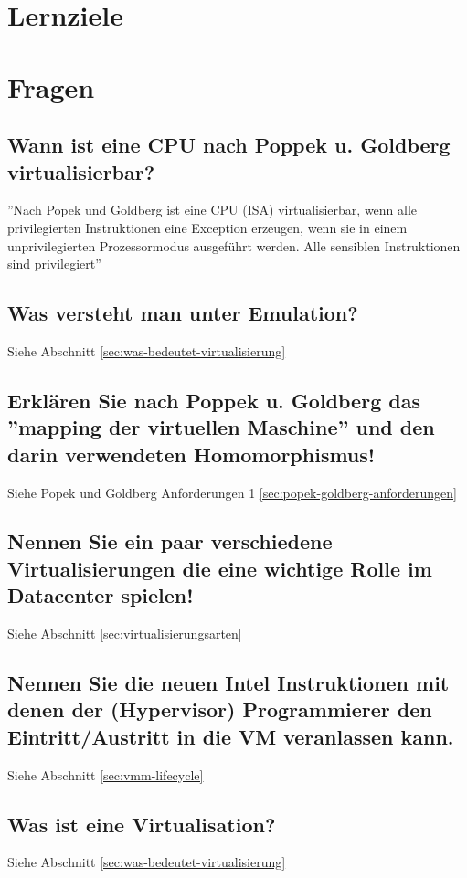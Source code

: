 \section{Lernziele}

\section{Fragen}
\subsection{Wann ist eine CPU nach Poppek u. Goldberg virtualisierbar?}
''Nach Popek und Goldberg ist eine CPU (ISA) virtualisierbar, wenn
alle privilegierten Instruktionen eine Exception erzeugen, wenn sie
in einem unprivilegierten Prozessormodus ausgeführt werden.
Alle sensiblen Instruktionen sind privilegiert''

\subsection{Was versteht man unter Emulation?}
Siehe Abschnitt \ref{sec:was-bedeutet-virtualisierung}

\subsection{Erklären Sie nach Poppek u. Goldberg das ''mapping der virtuellen Maschine'' und den darin verwendeten Homomorphismus!}
Siehe Popek und Goldberg Anforderungen 1 \ref{sec:popek-goldberg-anforderungen}

\subsection{Nennen Sie ein paar verschiedene Virtualisierungen die eine wichtige Rolle im Datacenter spielen!}
Siehe Abschnitt \ref{sec:virtualisierungsarten}

\subsection{Nennen Sie die neuen Intel Instruktionen mit denen der (Hypervisor) Programmierer den Eintritt/Austritt in die VM veranlassen kann.}
Siehe Abschnitt \ref{sec:vmm-lifecycle}

\subsection{Was ist eine Virtualisation?}
Siehe Abschnitt \ref{sec:was-bedeutet-virtualisierung}

